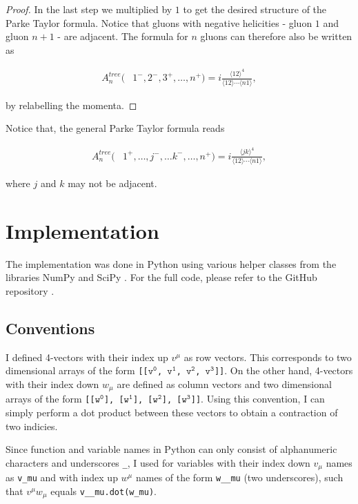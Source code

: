 \documentclass{article}
\theoremstyle{definition}
\def\code#1{\texttt{#1}}
\numberwithin{equation}{section}
\begin{document}
\begin{proof}
In the last step we multiplied by $1$ to get the desired structure of the Parke Taylor formula. Notice that gluons with negative helicities - gluon $1$ and gluon $n+1$ -  are adjacent. The formula for $n$ gluons can therefore also be written as

\begin{align}
    A_n^{tree}(&1^{-}, 2^{-}, 3^{+}, \dots , n^{+}) = i \frac{ \langle 12 \rangle^4 }{ \langle 12 \rangle \cdots \langle n1 \rangle },
\end{align}

by relabelling the momenta.

\end{proof}

Notice that, the general Parke Taylor formula reads

\begin{align}
    A_n^{tree}(&1^{+}, \dots, j^{-}, \dots k^{-}, \dots, n^{+}) = i \frac{ \langle jk \rangle^4 }{ \langle 12 \rangle \cdots \langle n1 \rangle },
\end{align}

where $j$ and $k$ may not be adjacent.  

\section{Implementation}
\label{sec:implementation}

The implementation was done in Python using various helper classes from the libraries NumPy \cite{numpy} and SciPy \cite{scipy}. For the full code, please refer to the GitHub repository \cite{github}.

\subsection{Conventions}

I defined 4-vectors with their index up $v^{\mu}$ as row vectors. This corresponds to two dimensional arrays of the form \code{[[$\code{v}^{\code{0}}$, $\code{v}^{\code{1}}$, $\code{v}^{\code{2}}$, $\code{v}^{\code{3}}$]]}. On the other hand, 4-vectors with their index down $w_{\mu}$ are defined as column vectors and two dimensional arrays of the form \code{[[$\code{w}^{\code{0}}$], [$\code{w}^{\code{1}}$], [$\code{w}^{\code{2}}$], [$\code{w}^{\code{3}}$]]}. Using this convention, I can simply perform a dot product between these vectors to obtain a contraction of two indicies.

Since function and variable names in Python can only consist of alphanumeric characters and underscores \code{\_}, I used for variables with their index down $v_{\mu}$ names as \code{v\_mu} and with index up $w^{\mu}$ names of the form \code{w\_\_mu} (two underscores), such that $v^{\mu} w_{\mu}$ equals \code{v\_\_mu.dot(w\_mu)}.
\end{document}
